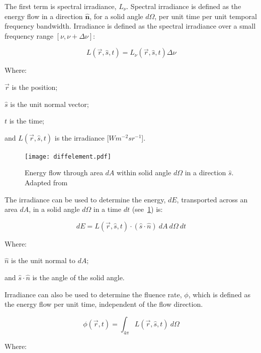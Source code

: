 The first term is spectral irradiance, $L_\nu$. Spectral irradiance is defined as the energy flow in a direction $\mathbf{\hat{n}}$, for a solid angle $d\Omega$, per unit time per unit temporal frequency bandwidth.	
Irradiance is defined as the spectral irradiance over a small frequency range $[\nu, \nu+\Delta \nu]$:

\begin{equation}
	L(\vec{r},\hat{s},t) = L_{\nu}(\vec{r},\hat{s},t)\Delta \nu	
\end{equation}

\noindent Where:

\indent $\vec{r}$ is the position;

\indent $\hat{s}$ is the unit normal vector;

\indent $t$ is the time;

\indent and $L(\vec{r},\hat{s},t)$ is the irradiance [$W m^{-2} sr^{-1}$].

\medskip

\begin{figure}[!htb]
	\centering
	\texttt{[image: diffelement.pdf]}
	\caption{Energy flow through area $dA$ within solid angle $d\Omega$ in a direction $\hat{s}$. Adapted from~\cite{wang2012biomedical,chandrasekhar2013radiative}}
	\label{fig:energydiag1}
\end{figure}

The irradiance can be used to determine the energy, $dE$, transported across an area $dA$, in a solid angle $d\Omega$ in a time $dt$ (see~\cref{fig:energydiag1}) is:

\begin{equation}
	dE = L(\vec{r},\hat{s},t) \cdot (\hat{s} \cdot \hat{n})\ dA\ d\Omega\ dt
\end{equation}

\noindent Where:

\indent $\hat{n}$ is the unit normal to $dA$;

\indent and $\hat{s}\cdot\hat{n}$ is the angle of the solid angle.

\medskip

Irradiance can also be used to determine the fluence rate, $\phi$, which is defined as the energy flow per unit time, independent of the flow direction.

\begin{equation}
	\phi(\vec{r},t)=\int_{4\pi}L(\vec{r},\hat{s},t)\ d\Omega
\end{equation}

\noindent Where:

